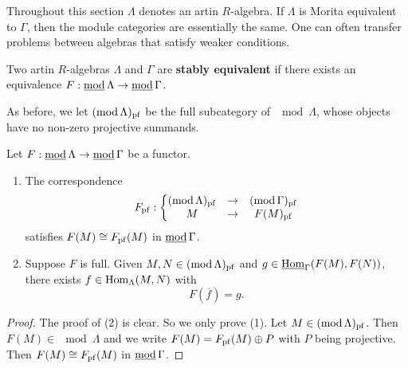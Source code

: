 
Throughout this section $\Lambda$ denotes an artin $R$-algebra. If $\Lambda$ is Morita equivalent to $\Gamma$, then the module categories are essentially the same. One can often transfer problems between algebras that satisfy weaker conditions.


\begin{definition}
Two artin $R$-algebras $\Lambda$ and $\Gamma$ are \textbf{stably equivalent} if there exists an equivalence $F: \operatorname{\underline{\operatorname{mod}}}{\Lambda} \to \operatorname{\underline{\operatorname{mod}}}{\Gamma}$.
\end{definition}


As before, we let $(\operatorname{mod} \Lambda)_{\mathrm{pf}}$ be the full subcategory of $\mod \Lambda$, whose objects have no non-zero projective summands.


\begin{lemma}\label{3.3.1}
Let $F: \operatorname{\underline{\operatorname{mod}}} \Lambda \to \operatorname{\underline{\operatorname{mod}}} \Gamma$ be a functor.
\begin{enumerate}
\item The correspondence
\[
F_{\mathrm{pf}} :
\left\{
\begin{matrix}
(\operatorname{mod} \Lambda)_{\mathrm{pf}} & \to & (\operatorname{mod} \Gamma)_{\mathrm{pf}} \\
M & \to & F(M)_{\mathrm{pf}}
\end{matrix}
\right.
\]
satisfies $F(M) \cong F_{\mathrm{pf}}(M)$ in $\operatorname{\underline{\operatorname{mod}}} \Gamma$.
\item Suppose $F$ is full. Given $M,N \in (\operatorname{mod} \Lambda)_{\mathrm{pf}}$ and $g \in \operatorname{\underline{\operatorname{Hom}}}_\Gamma(F(M),
F(N))$, there exists $f \in \operatorname{Hom}_\Lambda(M,N)$ with
\[
F(\overline f) = g.
\]
\end{enumerate}
\end{lemma}


\begin{proof}
The proof of (2) is clear. So we only prove (1). Let $M \in (\operatorname{mod} \Lambda)_{\mathrm{pf}}$. Then $F(M) \in \mod \Lambda$ and we write $F(M) = F_{\mathrm{pf}}(M) \oplus P$ with $P$ being projective. Then $F(M) \cong F_{\mathrm{pf}}(M)$ in $\operatorname{\underline{\operatorname{mod}}} \Gamma$.
\end{proof}

